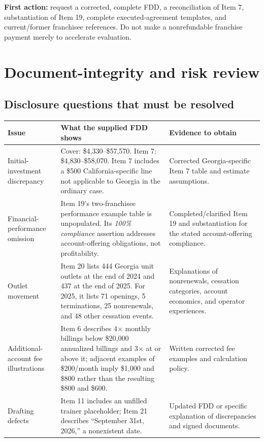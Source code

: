 \documentclass[10pt,letterpaper]{article}
\begin{document}
\begin{prioritybox}
\textbf{First action:} request a corrected, complete FDD, a reconciliation of
Item 7, substantiation of Item 19, complete executed-agreement templates, and
current/former franchisee references. Do not make a nonrefundable franchise
payment merely to accelerate evaluation.
\end{prioritybox}

\section{Document-integrity and risk review}
\subsection{Disclosure questions that must be resolved}
\begin{tabularx}{\linewidth}{@{}p{.22\linewidth}Y p{.24\linewidth}@{}}
\toprule
\textbf{Issue} & \textbf{What the supplied FDD shows} & \textbf{Evidence to obtain}\\\midrule
Initial-investment discrepancy & Cover: \$4,330--\$57,570. Item 7: \$4,830--\$58,070. Item 7 includes a \$500 California-specific line not applicable to Georgia in the ordinary case. & Corrected Georgia-specific Item 7 table and estimate assumptions.\\
Financial-performance omission & Item 19's two-franchisee performance example table is unpopulated. Its \emph{100\% compliance} assertion addresses account-offering obligations, not profitability. & Completed/clarified Item 19 and substantiation for the stated account-offering compliance.\\
Outlet movement & Item 20 lists 444 Georgia unit outlets at the end of 2024 and 437 at the end of 2025. For 2025, it lists 71 openings, 5 terminations, 25 nonrenewals, and 48 other cessation events. & Explanations of nonrenewals, cessation categories, account economics, and operator experiences.\\
Additional-account fee illustrations & Item 6 describes 4\(\times\) monthly billings below \$20,000 annualized billings and 3\(\times\) at or above it; adjacent examples of \$200/month imply \$1,000 and \$800 rather than the resulting \$800 and \$600. & Written corrected fee examples and calculation policy.\\
Drafting defects & Item 11 includes an unfilled trainer placeholder; Item 21 describes ``September 31st, 2026,'' a nonexistent date. & Updated FDD or specific explanation of discrepancies and signed documents.\\
\bottomrule
\end{tabularx}
\end{document}
